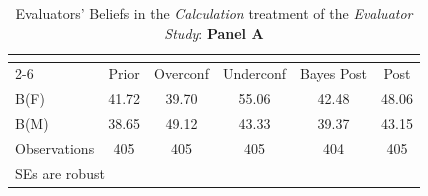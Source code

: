 \begin{table}[htbp]\centering
\caption{Evaluators' Beliefs in the \textit{Calculation} treatment of the \textit{Evaluator Study}: \textbf{Panel A}}
\begin{tabular}{l*{5}{c}}
\hline\hline
                &\multicolumn{5}{c}{}                             \\\cmidrule(lr){2-6}
                &\multicolumn{1}{c}{Prior}&\multicolumn{1}{c}{Overconf}&\multicolumn{1}{c}{Underconf}&\multicolumn{1}{c}{Bayes Post}&\multicolumn{1}{c}{Post}\\
\hline
B(F)            &    41.72&    39.70&    55.06&    42.48&    48.06\\
B(M)            &    38.65&    49.12&    43.33&    39.37&    43.15\\
\hline
Observations    &      405&      405&      405&      404&      405\\
\hline\hline
\multicolumn{6}{l}{\footnotesize SEs are robust}\\
\end{tabular}
\end{table}
